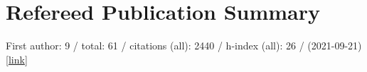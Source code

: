 \section*{Refereed Publication Summary}

First author: 9 / total: 61 / citations (all): 2440 / h-index (all): 26 / (2021-09-21) [\href{https://ui.adsabs.harvard.edu/#/public-libraries/G0Ow9TGTRyuVT7hbhzailA}{link}]
